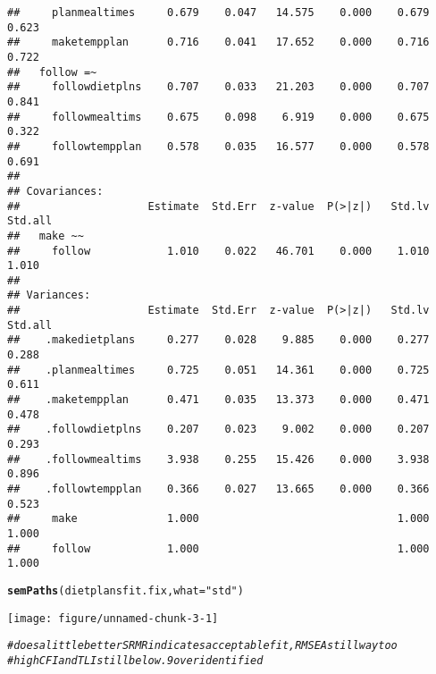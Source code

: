 \documentclass{article}\usepackage[]{graphicx}\usepackage[]{color}
\makeatletter
\def\maxwidth{ %
  \ifdim\Gin@nat@width>\linewidth
    \linewidth
  \else
    \Gin@nat@width
  \fi
}
\newcommand{\hlstr}[1]{\textcolor[rgb]{0.192,0.494,0.8}{#1}}%
\newcommand{\hlcom}[1]{\textcolor[rgb]{0.678,0.584,0.686}{\textit{#1}}}%
\newcommand{\hlstd}[1]{\textcolor[rgb]{0.345,0.345,0.345}{#1}}%
\newcommand{\hlkwc}[1]{\textcolor[rgb]{0.333,0.667,0.333}{#1}}%
\newcommand{\hlkwd}[1]{\textcolor[rgb]{0.737,0.353,0.396}{\textbf{#1}}}%
\newenvironment{kframe}{%
 \def\at@end@of@kframe{}%
 \ifinner\ifhmode%
  \def\at@end@of@kframe{\end{minipage}}%
  \begin{minipage}{\columnwidth}%
 \fi\fi%
 \def\FrameCommand##1{\hskip\@totalleftmargin \hskip-\fboxsep
 \colorbox{shadecolor}{##1}\hskip-\fboxsep
     \hskip-\linewidth \hskip-\@totalleftmargin \hskip\columnwidth}%
 \MakeFramed {\advance\hsize-\width
   \@totalleftmargin\z@ \linewidth\hsize
   \@setminipage}}%
 {\par\unskip\endMakeFramed%
 \at@end@of@kframe}
\newenvironment{knitrout}{}{} %
\makeatother
\begin{document}
\begin{knitrout}
\begin{kframe}
\begin{verbatim}
##     planmealtimes     0.679    0.047   14.575    0.000    0.679    0.623
##     maketempplan      0.716    0.041   17.652    0.000    0.716    0.722
##   follow =~                                                             
##     followdietplns    0.707    0.033   21.203    0.000    0.707    0.841
##     followmealtims    0.675    0.098    6.919    0.000    0.675    0.322
##     followtempplan    0.578    0.035   16.577    0.000    0.578    0.691
## 
## Covariances:
##                    Estimate  Std.Err  z-value  P(>|z|)   Std.lv  Std.all
##   make ~~                                                               
##     follow            1.010    0.022   46.701    0.000    1.010    1.010
## 
## Variances:
##                    Estimate  Std.Err  z-value  P(>|z|)   Std.lv  Std.all
##    .makedietplans     0.277    0.028    9.885    0.000    0.277    0.288
##    .planmealtimes     0.725    0.051   14.361    0.000    0.725    0.611
##    .maketempplan      0.471    0.035   13.373    0.000    0.471    0.478
##    .followdietplns    0.207    0.023    9.002    0.000    0.207    0.293
##    .followmealtims    3.938    0.255   15.426    0.000    3.938    0.896
##    .followtempplan    0.366    0.027   13.665    0.000    0.366    0.523
##     make              1.000                               1.000    1.000
##     follow            1.000                               1.000    1.000
\end{verbatim}
\begin{alltt}
\hlkwd{semPaths}\hlstd{(dietplansfit.fix,} \hlkwc{what} \hlstd{=} \hlstr{"std"}\hlstd{)}
\end{alltt}
\end{kframe}
\texttt{[image: figure/unnamed-chunk-3-1]} 
\begin{kframe}\begin{alltt}
\hlcom{# does a little better SRMR indicates acceptable fit, RMSEA still way too}
\hlcom{# high CFI and TLI still below .9 overidentified}


\end{alltt}
\end{kframe}
\end{knitrout}
\end{document}

